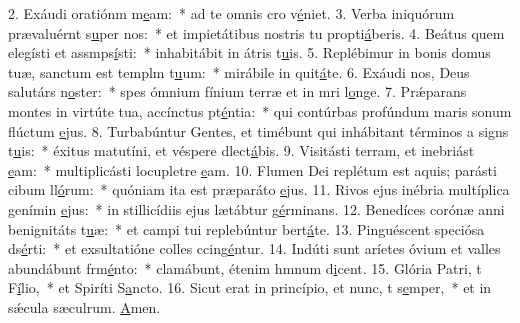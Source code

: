 2. Exáudi oratiónm m\uline{e}am:~* ad te omnis cro v\uline{é}niet.
3. Verba iniquórum prævaluérnt s\uline{u}per nos:~* et impietátibus nostris tu propti\uline{á}beris.
4. Beátus quem elegísti et assmps\uline{í}sti:~* inhabitábit in átris t\uline{u}is.
5. Replébimur in bonis domus tuæ, sanctum est templm t\uline{u}um:~* mirábile in quit\uline{á}te.
6. Exáudi nos, Deus salutárs n\uline{o}ster:~* spes ómnium fínium terræ et in mri l\uline{o}nge.
7. Prǽparans montes in virtúte tua, accínctus pt\uline{é}ntia:~* qui contúrbas profúndum maris sonum flúctum \uline{e}jus.
8. Turbabúntur Gentes, et timébunt qui inhábitant términos a signs t\uline{u}is:~* éxitus matutíni, et véspere dlect\uline{á}bis.
9. Visitásti terram, et inebriást \uline{e}am:~* multiplicásti locupletre \uline{e}am.
10. Flumen Dei replétum est aquis; parásti cibum ll\uline{ó}rum:~* quóniam ita est præparáto \uline{e}jus.
11. Rivos ejus inébria multíplica genímin \uline{e}jus:~* in stillicídiis ejus lætábtur g\uline{é}rminans.
12. Benedíces corónæ anni benignitáts t\uline{u}æ:~* et campi tui replebúntur bert\uline{á}te.
13. Pinguéscent speciósa ds\uline{é}rti:~* et exsultatióne colles ccing\uline{é}ntur.
14. Indúti sunt aríetes óvium et valles abundábunt frm\uline{é}nto:~* clamábunt, étenim hmnum d\uline{i}cent.
15. Glória Patri, t F\uline{í}lio,~* et Spiríti S\uline{a}ncto.
16. Sicut erat in princípio, et nunc, t s\uline{e}mper,~* et in sǽcula sæculrum. \uline{A}men.
